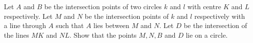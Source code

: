 Let $A$ and $B$ be the intersection points of two circles $k$ and $l$ with centre $K$ and $L$ respectively.
Let $M$ and $N$ be the intersection points of $k$ and $l$ respectively with a
line through $A$ such that $A$ lies between $M$ and $N$. 
Let $D$ be the intersection of the lines $MK$ and $NL$. 
Show that the points $M,N,B$ and $D$ lie on a circle.